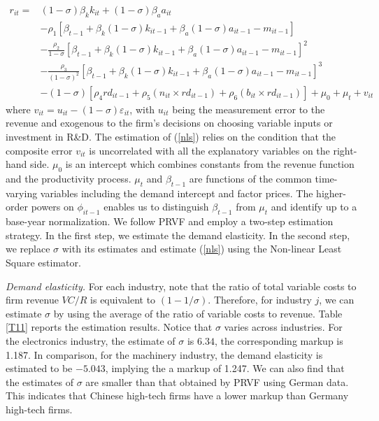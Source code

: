 \documentclass[11pt]{article}
\begin{document}
\begin{align} \label{nls}
r_{it}=& \left(1-\sigma\right)\beta_{k}k_{it}+\left(1-\sigma\right)\beta_{a}a_{it}  \\
       &-\rho_{1}\left[\beta_{t-1}+\beta_{k}\left(1-\sigma\right)k_{it-1}+\beta_{a}\left(1-\sigma\right)a_{it-1}-m_{it-1}\right] \nonumber \\
 & -\frac{\rho_{2}}{1-\sigma}\left[\beta_{t-1}+\beta_{k}\left(1-\sigma\right)k_{it-1}+\beta_{a}\left(1-\sigma\right)a_{it-1}-m_{it-1}\right]^{2} \nonumber \\
 & -\frac{\rho_{3}}{\left(1-\sigma\right)^{2}}\left[\beta_{t-1}+\beta_{k}\left(1-\sigma\right)k_{it-1}+\beta_{a}\left(1-\sigma\right)a_{it-1}-m_{it-1}\right]^{3} \nonumber \\
 & -\left(1-\sigma\right)\left[\rho_{4}rd_{it-1}+\rho_{5}\left( n_{it}\times rd_{it-1}\right)+\rho_{6}\left( b_{it} \times rd_{it-1}\right)\right]+ \mu_{0}+\mu_{t}+v_{it} \nonumber 
\end{align}
where $v_{it}=u_{it}-\left(1-\sigma\right)\varepsilon_{it}$, with 
$u_{it}$ being the measurement error to the revenue and exogenous to
the firm's decisions on choosing variable inputs or investment in
R\&D. The estimation of (\ref{nls}) relies on the condition that
the composite error $v_{it}$ is uncorrelated with all the explanatory
variables on the right-hand side. $\mu_{0}$ is an intercept which
combines constants from the revenue function and the productivity
process. $\mu_{t}$ and $\beta_{t-1}$ are functions of the common
time-varying variables including the demand intercept and factor prices. The higher-order powers on $\phi_{it-1}$ enables us to distinguish $\beta_{t-1}$ from $\mu_{t}$ and identify up to a base-year normalization. We follow PRVF and employ a two-step estimation strategy. In the first step, we estimate the demand elasticity. In the second step, we replace $\sigma$ with its estimates and estimate (\ref{nls}) using the Non-linear Least Square estimator.

\textit{Demand elasticity.} For each industry, note that the ratio of total variable costs to firm revenue $VC/R$ is equivalent to $\left(1-1/\sigma \right)$. Therefore, for industry $j$, we can estimate $\sigma$ by using the average of the ratio of variable costs to revenue. Table \ref{T11} reports the estimation results. Notice that $\sigma$ varies across industries. For the electronics industry, the estimate of $\sigma$ is $6.34$, the corresponding markup is 1.187. In comparison,
for the machinery industry, the demand elasticity is estimated
to be $-5.043$, implying the a markup of 1.247. We can also find
that the estimates of $\sigma$ are smaller than that obtained by PRVF using German data.
This indicates that Chinese high-tech firms have a lower markup than
Germany high-tech firms. 
\end{document}
